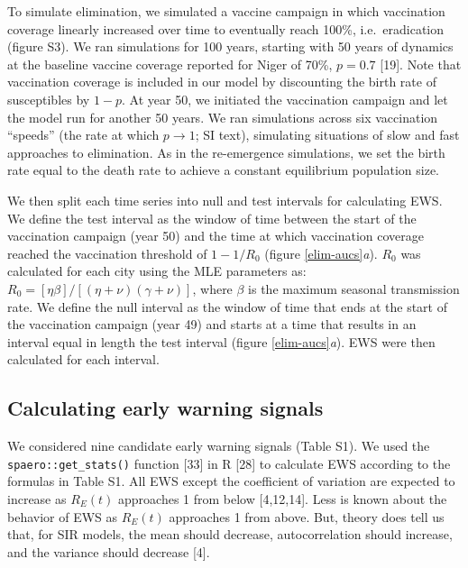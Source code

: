 \documentclass[3p]{elsarticle} %
\begin{document}
To simulate elimination, we simulated a vaccine campaign in which
vaccination coverage linearly increased over time to eventually reach
100\%, i.e.~eradication (figure S3). We ran simulations for 100 years,
starting with 50 years of dynamics at the baseline vaccine coverage
reported for Niger of 70\%, \(p = 0.7\) {[}19{]}. Note that vaccination
coverage is included in our model by discounting the birth rate of
susceptibles by \(1-p\). At year 50, we initiated the vaccination
campaign and let the model run for another 50 years. We ran simulations
across six vaccination ``speeds'' (the rate at which
\(p \rightarrow 1\); SI text), simulating situations of slow and fast
approaches to elimination. As in the re-emergence simulations, we set
the birth rate equal to the death rate to achieve a constant equilibrium
population size.

We then split each time series into null and test intervals for
calculating EWS. We define the test interval as the window of time
between the start of the vaccination campaign (year 50) and the time at
which vaccination coverage reached the vaccination threshold of
\(1 - 1/R_0\) (figure \ref{elim-aucs}\emph{a}). \(R_0\) was calculated
for each city using the MLE parameters as:
\(R_0 = \left[\eta \beta \right]/ \left[\left(\eta+\nu\right)\left(\gamma+\nu\right)\right]\),
where \(\beta\) is the maximum seasonal transmission rate. We define the
null interval as the window of time that ends at the start of the
vaccination campaign (year 49) and starts at a time that results in an
interval equal in length the test interval (figure
\ref{elim-aucs}\emph{a}). EWS were then calculated for each interval.

\hypertarget{calculating-early-warning-signals}{%
\subsection{Calculating early warning
signals}\label{calculating-early-warning-signals}}

We considered nine candidate early warning signals (Table S1). We used
the \texttt{spaero::get\_stats()} function {[}33{]} in R {[}28{]} to
calculate EWS according to the formulas in Table S1. All EWS except the
coefficient of variation are expected to increase as \(R_E(t)\)
approaches 1 from below {[}4,12,14{]}. Less is known about the behavior
of EWS as \(R_E(t)\) approaches 1 from above. But, theory does tell us
that, for SIR models, the mean should decrease, autocorrelation should
increase, and the variance should decrease {[}4{]}.
\end{document}

